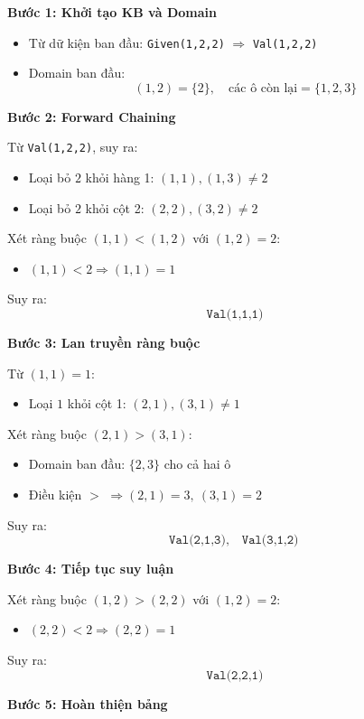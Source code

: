 \textbf{Bước 1: Khởi tạo KB và Domain}

\begin{itemize}
    \item Từ dữ kiện ban đầu: \texttt{Given(1,2,2)} $\Rightarrow$ \texttt{Val(1,2,2)}
    \item Domain ban đầu:
    \[
    (1,2) = \{2\}, \quad \text{các ô còn lại} = \{1,2,3\}
    \]
\end{itemize}

\textbf{Bước 2: Forward Chaining}

Từ \texttt{Val(1,2,2)}, suy ra:

\begin{itemize}
    \item Loại bỏ $2$ khỏi hàng 1: $(1,1),(1,3) \neq 2$
    \item Loại bỏ $2$ khỏi cột 2: $(2,2),(3,2) \neq 2$
\end{itemize}

Xét ràng buộc $(1,1) < (1,2)$ với $(1,2)=2$:
\begin{itemize}
    \item $(1,1) < 2 \Rightarrow (1,1) = 1$
\end{itemize}

Suy ra:
\[
\texttt{Val(1,1,1)}
\]

\textbf{Bước 3: Lan truyền ràng buộc}

Từ $(1,1)=1$:
\begin{itemize}
    \item Loại $1$ khỏi cột 1: $(2,1),(3,1) \neq 1$
\end{itemize}

Xét ràng buộc $(2,1) > (3,1)$:
\begin{itemize}
    \item Domain ban đầu: $\{2,3\}$ cho cả hai ô
    \item Điều kiện $>$ $\Rightarrow (2,1)=3,\ (3,1)=2$
\end{itemize}

Suy ra:
\[
\texttt{Val(2,1,3)}, \quad \texttt{Val(3,1,2)}
\]

\textbf{Bước 4: Tiếp tục suy luận}

Xét ràng buộc $(1,2) > (2,2)$ với $(1,2)=2$:
\begin{itemize}
    \item $(2,2) < 2 \Rightarrow (2,2)=1$
\end{itemize}

Suy ra:
\[
\texttt{Val(2,2,1)}
\]

\textbf{Bước 5: Hoàn thiện bảng}

